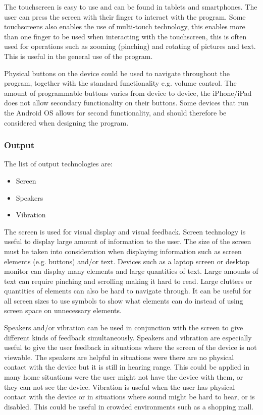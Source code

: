The touchscreen is easy to use and can be found in tablets and smartphones. The user can press the screen with their finger to interact with the program. Some touchscreens also enables the use of multi-touch technology, this enables more than one finger to be used when interacting with the touchscreen, this is often used for operations such as zooming (pinching) and rotating of pictures and text. This is useful in the general use of the program.

Physical buttons on the device could be used to navigate throughout the program, together with the standard functionality e.g. volume control. The amount of programmable buttons varies from device to device, the iPhone/iPad does not allow secondary functionality on their buttons. Some devices that run the Android OS allows for second functionality\cite{android_Rebind}, and should therefore be considered when designing the program.

\subsubsection{Output}
The list of output technologies are:

\begin{itemize}
    \item Screen
    \item Speakers
    \item Vibration
\end{itemize}

The screen is used for visual display and visual feedback. Screen technology is useful to display large amount of information to the user.
The size of the screen must be taken into consideration when displaying information such as screen elements (e.g. buttons) and/or text.
Devices such as a laptop screen or desktop monitor can display many elements and large quantities of text.
Large amounts of text can require pinching and scrolling making it hard to read. Large clutters or quantities of elements can also be hard to navigate through.
It can be useful for all screen sizes to use symbols to show what elements can do instead of using screen space on unnecessary elements.

Speakers and/or vibration can be used in conjunction with the screen to give different kinds of feedback simultaneously.
Speakers and vibration are especially useful to give the user feedback in situations where the screen of the device is not viewable.
The speakers are helpful in situations were there are no physical contact with the device but it is still in hearing range.
This could be applied in many home situations were the user might not have the device with them, or they can not see the device.
Vibration is useful when the user has physical contact with the device or in situations where sound might be hard to hear, or is disabled.
This could be useful in crowded environments such as a shopping mall.     

